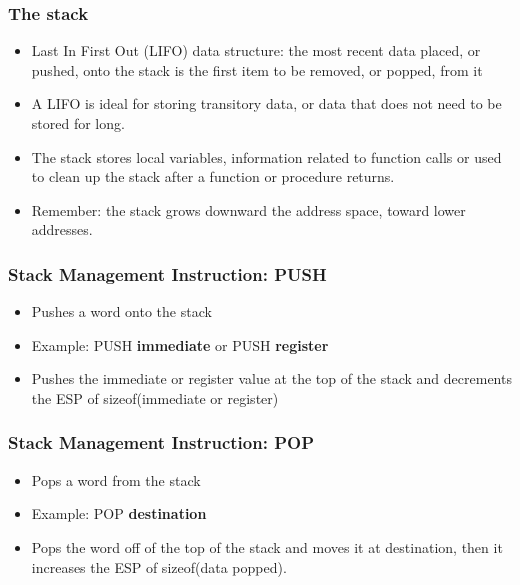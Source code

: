 \documentclass[]{beamer}
\begin{document}
\begin{frame}
  \frametitle{The stack}
  \begin{itemize}
  \item{Last In First Out (LIFO) data structure: the most recent data placed, or pushed, onto the stack is the first item to be removed, or popped, from it}
  \item{A LIFO is ideal for storing transitory data, or data that does not need to be stored for long.}
  \item{The stack stores local variables, information related to function calls or used to clean up the stack after a function or procedure returns.}
  \item{Remember: the stack grows downward the address space, toward lower addresses.}
  \end{itemize}
\end{frame}
\begin{frame}
  \frametitle{Stack Management Instruction: PUSH}
  \begin{itemize}
  \item{Pushes a word onto the stack}
  \item{Example: PUSH {\bf immediate} or PUSH {\bf register} }
  \item{Pushes the immediate or register value at the top of the stack and decrements the ESP of sizeof(immediate or register)}
  \end{itemize}
\end{frame}
\begin{frame}
  \frametitle{Stack Management Instruction: POP}
  \begin{itemize}
  \item{Pops a word from the stack}
  \item{Example: POP {\bf destination} }
  \item{Pops the word off of the top of the stack and moves it at destination, then it increases the ESP of sizeof(data popped).}
  \end{itemize}
\end{frame}
\end{document}
